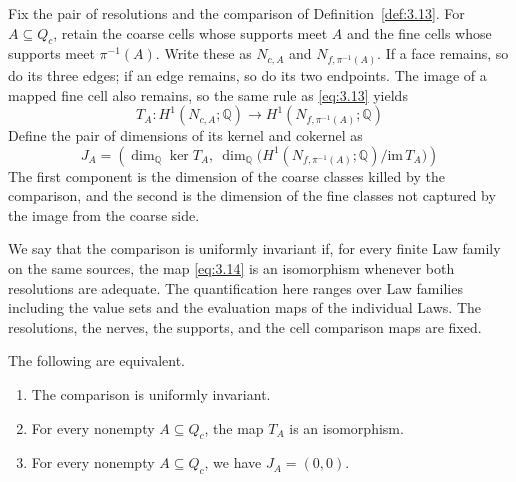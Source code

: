 \begin{definition}\label{def:3.20}

Fix the pair of resolutions and the comparison of Definition~\ref{def:3.13}.
For $A\subseteq Q_c$, retain the coarse cells whose supports meet $A$ and the fine
cells whose supports meet $\pi^{-1}(A)$.
Write these as $N_{c,A}$ and $N_{f,\pi^{-1}(A)}$.
If a face remains, so do its three edges; if an edge remains, so do its two
endpoints.
The image of a mapped fine cell also remains, so the same rule as \eqref{eq:3.13}
yields
\begin{equation*}
T_A:H^1(N_{c,A};\mathbb{Q})
\longrightarrow H^1(N_{f,\pi^{-1}(A)};\mathbb{Q})
\tag{3.16}\label{eq:3.16}
\end{equation*}
Define the pair of dimensions of its kernel and cokernel as
\begin{equation*}
J_A=\left(\dim_{\mathbb{Q}}\ker T_A,\
\dim_{\mathbb{Q}}\bigl(H^1(N_{f,\pi^{-1}(A)};\mathbb{Q})/\mathrm{im}\,T_A\bigr)\right)
\tag{3.17}\label{eq:3.17}
\end{equation*}
The first component is the dimension of the coarse classes killed by the comparison,
and the second is the dimension of the fine classes not captured by the image from
the coarse side.

\end{definition}

\begin{definition}\label{def:3.21}

We say that the comparison is uniformly invariant if, for every finite Law family on
the same sources, the map \eqref{eq:3.14} is an isomorphism whenever both resolutions
are adequate.
The quantification here ranges over Law families including the value sets and the
evaluation maps of the individual Laws.
The resolutions, the nerves, the supports, and the cell comparison maps are fixed.

\end{definition}

\begin{theorem}\label{thm:3.22}

The following are equivalent.

\begin{enumerate}
\item The comparison is uniformly invariant.
\item For every nonempty $A\subseteq Q_c$, the map $T_A$ is an isomorphism.
\item For every nonempty $A\subseteq Q_c$, we have $J_A=(0,0)$.
\end{enumerate}

\end{theorem}

